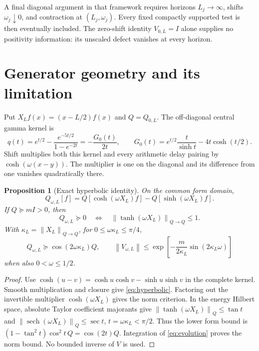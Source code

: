 \documentclass[11pt]{article}
\newtheorem{proposition}[theorem]{Proposition}
\theoremstyle{remark}\newtheorem{remark}[theorem]{Remark}
\newcommand{\norm}[1]{\left\|#1\right\|}
\begin{document}
A final diagonal argument in that framework requires horizons $L_j\to\infty$, shifts $\omega_j\downarrow0$, and contraction at $(L_j,\omega_j)$. Every fixed compactly supported test is then eventually included. The zero-shift identity $V_{0,L}=I$ alone supplies no positivity information: its unscaled defect vanishes at every horizon.

\section{Generator geometry and its limitation}\label{sec:generator}

Put $X_Lf(x)=(x-L/2)f(x)$ and $Q=Q_{0,L}$. The off-diagonal central gamma kernel is
\begin{equation}\label{eq:G}
 q(t)=e^{t/2}-\frac{e^{-5t/2}}{1-e^{-2t}}=-\frac{G_0(t)}{2t},\qquad
 G_0(t)=e^{t/2}\frac{t}{\sinh t}-4t\cosh(t/2).
\end{equation}
Shift multiplies both this kernel and every arithmetic delay pairing by $\cosh(\omega(x-y))$. The multiplier is one on the diagonal and its difference from one vanishes quadratically there.

\begin{proposition}[Exact hyperbolic identity]\label{prop:hyperbolic}
On the common form domain,
\begin{equation}\label{eq:hyperbolic}
 Q_{\omega,L}[f]=Q[\cosh(\omega X_L)f]-Q[\sinh(\omega X_L)f].
\end{equation}
If $Q\succeq mI>0$, then
\[
 Q_{\omega,L}\succeq0\quad\Longleftrightarrow\quad
 \norm{\tanh(\omega X_L)}_{Q\to Q}\le1.
\]
With $\kappa_L=\norm{X_L}_{Q\to Q}$, for $0\le\omega\kappa_L\le\pi/4$,
\begin{equation}\label{eq:kappa}
 Q_{\omega,L}\succeq\cos(2\omega\kappa_L)Q,\qquad
 \norm{V_{\omega,L}}\le\exp\left[-\frac{m}{2\kappa_L}\sin(2\kappa_L\omega)\right]
\end{equation}
when also $0<\omega\le1/2$.
\end{proposition}
\begin{proof}
Use $\cosh(u-v)=\cosh u\cosh v-\sinh u\sinh v$ in the complete kernel. Smooth multiplication and closure give \eqref{eq:hyperbolic}. Factoring out the invertible multiplier $\cosh(\omega X_L)$ gives the norm criterion. In the energy Hilbert space, absolute Taylor coefficient majorants give
$\norm{\tanh(\omega X_L)}_Q\le\tan t$ and
$\norm{\operatorname{sech}(\omega X_L)}_Q\le\sec t$, $t=\omega\kappa_L<\pi/2$.
Thus the lower form bound is $(1-\tan^2t)\cos^2t\,Q=\cos(2t)Q$. Integration of \eqref{eq:evolution} proves the norm bound. No bounded inverse of $V$ is used.
\end{proof}
\end{document}
